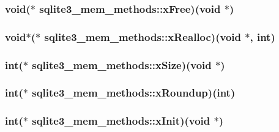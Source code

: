 \hypertarget{structsqlite3__mem__methods_a2e7fe8d030adaa17fd23a44fec1eca1}{
\subsubsection[xFree]{\setlength{\rightskip}{0pt plus 5cm}void($\ast$ {\bf sqlite3\_\-mem\_\-methods::xFree})(void $\ast$)}}
\label{structsqlite3__mem__methods_a2e7fe8d030adaa17fd23a44fec1eca1}


\hypertarget{structsqlite3__mem__methods_53084ccc58abc9e02ef662e4f5bc2963}{
\subsubsection[xRealloc]{\setlength{\rightskip}{0pt plus 5cm}void$\ast$($\ast$ {\bf sqlite3\_\-mem\_\-methods::xRealloc})(void $\ast$, int)}}
\label{structsqlite3__mem__methods_53084ccc58abc9e02ef662e4f5bc2963}


\hypertarget{structsqlite3__mem__methods_6c68275b577d66ae659ef30344c8f86c}{
\subsubsection[xSize]{\setlength{\rightskip}{0pt plus 5cm}int($\ast$ {\bf sqlite3\_\-mem\_\-methods::xSize})(void $\ast$)}}
\label{structsqlite3__mem__methods_6c68275b577d66ae659ef30344c8f86c}


\hypertarget{structsqlite3__mem__methods_8b3f0d1ddeb498c4aaf9bbce5b92a268}{
\subsubsection[xRoundup]{\setlength{\rightskip}{0pt plus 5cm}int($\ast$ {\bf sqlite3\_\-mem\_\-methods::xRoundup})(int)}}
\label{structsqlite3__mem__methods_8b3f0d1ddeb498c4aaf9bbce5b92a268}


\hypertarget{structsqlite3__mem__methods_d0997b548928358d655000b6ac825cf4}{
\subsubsection[xInit]{\setlength{\rightskip}{0pt plus 5cm}int($\ast$ {\bf sqlite3\_\-mem\_\-methods::xInit})(void $\ast$)}}
\label{structsqlite3__mem__methods_d0997b548928358d655000b6ac825cf4}


